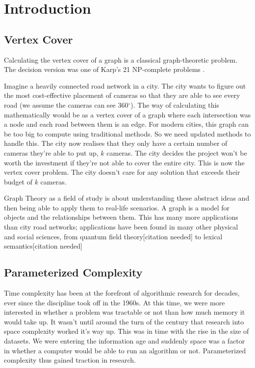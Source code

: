 \section{Introduction}

\subsection{Vertex Cover}

Calculating the vertex cover of a graph is a classical graph-theoretic problem.
The decision version was one of Karp's 21 NP-complete problems
\cite{karp1972reducibility}.

Imagine a heavily connected road network in a city. The city wants to figure
out the most cost-effective placement of cameras so that they are able to see
every road (we assume the cameras can see 360\(^\circ\)). The way of
calculating this mathematically would be as a vertex cover of a graph where
each intersection was a node and each road between them is an edge. For modern
cities, this graph can be too big to compute using traditional methods. So we
need updated methods to handle this. The city now realises that they only have
a certain number of cameras they're able to put up, \(k\) cameras. The city
decides the project won't be worth the investment if they're not able to cover
the entire city. This is now the vertex cover problem. The city doesn't care
for any solution that exceeds their budget of \(k\) cameras.

Graph Theory as a field of study is about understanding these abstract ideas
and then being able to apply them to real-life scenarios. A graph is a model
for objects and the relationships between them. This has many more applications
than city road networks; applications have been found in many other physical
and social sciences, from quantum field theory{[}citation needed{]} to lexical
semantics{[}citation needed{]}

\subsection{Parameterized Complexity}

Time complexity has been at the forefront of algorithmic research for decades,
ever since the discipline took off in the 1960s. At this time, we were more
interested in whether a problem was tractable or not than how much memory it
would take up. It wasn't until around the turn of the century that research
into space complexity worked it's way up. This was in time with the rise in the
size of datasets. We were entering the information age and suddenly space was a
factor in whether a computer would be able to run an algorithm or not.
Parameterized complexity thus gained traction in research.

